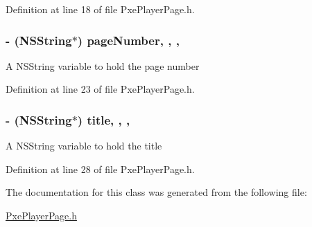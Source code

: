 Definition at line 18 of file Pxe\-Player\-Page.\-h.

\hypertarget{interface_pxe_player_page_a26a65d0db51a76c61b495a34e74bb51a}{
\subsubsection[{page\-Number}]{\setlength{\rightskip}{0pt plus 5cm}-\/ (N\-S\-String$\ast$) page\-Number\hspace{0.3cm}{\ttfamily [read]}, {\ttfamily [write]}, {\ttfamily [nonatomic]}, {\ttfamily [strong]}}}\label{interface_pxe_player_page_a26a65d0db51a76c61b495a34e74bb51a}
A N\-S\-String variable to hold the page number 

Definition at line 23 of file Pxe\-Player\-Page.\-h.

\hypertarget{interface_pxe_player_page_aa6d9e50eeb6d3d80141ee442ab5efa1b}{
\subsubsection[{title}]{\setlength{\rightskip}{0pt plus 5cm}-\/ (N\-S\-String$\ast$) title\hspace{0.3cm}{\ttfamily [read]}, {\ttfamily [write]}, {\ttfamily [nonatomic]}, {\ttfamily [strong]}}}\label{interface_pxe_player_page_aa6d9e50eeb6d3d80141ee442ab5efa1b}
A N\-S\-String variable to hold the title 

Definition at line 28 of file Pxe\-Player\-Page.\-h.



The documentation for this class was generated from the following file\-:\begin{DoxyCompactItemize}
\item 
\hyperlink{_pxe_player_page_8h}{Pxe\-Player\-Page.\-h}\end{DoxyCompactItemize}
